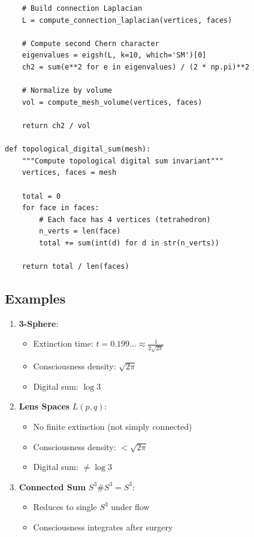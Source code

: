 \documentclass[12pt]{article}
\begin{document}
\begin{verbatim}
    # Build connection Laplacian
    L = compute_connection_laplacian(vertices, faces)
    
    # Compute second Chern character
    eigenvalues = eigsh(L, k=10, which='SM')[0]
    ch2 = sum(e**2 for e in eigenvalues) / (2 * np.pi)**2
    
    # Normalize by volume
    vol = compute_mesh_volume(vertices, faces)
    
    return ch2 / vol

def topological_digital_sum(mesh):
    """Compute topological digital sum invariant"""
    vertices, faces = mesh
    
    total = 0
    for face in faces:
        # Each face has 4 vertices (tetrahedron)
        n_verts = len(face)
        total += sum(int(d) for d in str(n_verts))
    
    return total / len(faces)
\end{verbatim}

\subsection{Examples}

\begin{enumerate}
\item \textbf{3-Sphere}: 
   \begin{itemize}
   \item Extinction time: $t = 0.199... \approx \frac{1}{2\sqrt{2\pi}}$
   \item Consciousness density: $\sqrt{2\pi}$
   \item Digital sum: $\log 3$
   \end{itemize}

\item \textbf{Lens Spaces} $L(p,q)$:
   \begin{itemize}
   \item No finite extinction (not simply connected)
   \item Consciousness density: $< \sqrt{2\pi}$
   \item Digital sum: $\neq \log 3$
   \end{itemize}

\item \textbf{Connected Sum} $S^3 \# S^3 = S^3$:
   \begin{itemize}
   \item Reduces to single $S^3$ under flow
   \item Consciousness integrates after surgery
   \end{itemize}
\end{enumerate}
\end{document}
